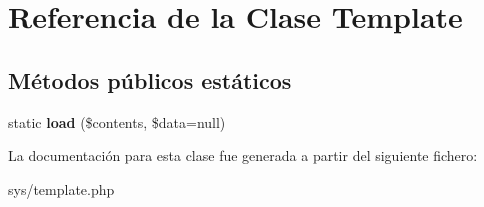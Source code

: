 \hypertarget{class_template}{}\section{Referencia de la Clase Template}
\label{class_template}
\subsection*{Métodos públicos estáticos}
\begin{DoxyCompactItemize}
\item 
\hypertarget{class_template_a58fdd5b502414a7db42dddfb3e0a1a6f}{}static {\bfseries load} (\$contents, \$data=null)\label{class_template_a58fdd5b502414a7db42dddfb3e0a1a6f}

\end{DoxyCompactItemize}


La documentación para esta clase fue generada a partir del siguiente fichero\+:\begin{DoxyCompactItemize}
\item 
sys/template.\+php\end{DoxyCompactItemize}
